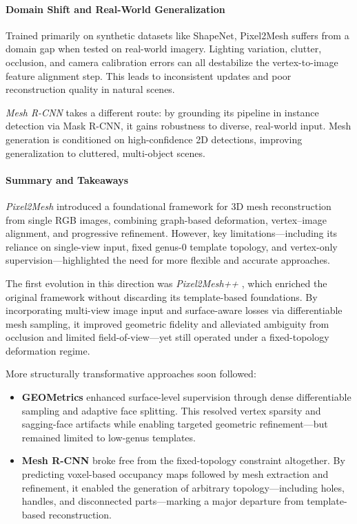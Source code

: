 \paragraph{Domain Shift and Real-World Generalization}

Trained primarily on synthetic datasets like ShapeNet, Pixel2Mesh suffers from a domain gap when tested on real-world imagery. Lighting variation, clutter, occlusion, and camera calibration errors can all destabilize the vertex-to-image feature alignment step. This leads to inconsistent updates and poor reconstruction quality in natural scenes.

\emph{Mesh R-CNN} \cite{gkioxari2020_meshrcnn} takes a different route: by grounding its pipeline in instance detection via Mask R-CNN, it gains robustness to diverse, real-world input. Mesh generation is conditioned on high-confidence 2D detections, improving generalization to cluttered, multi-object scenes.

\paragraph{Summary and Takeaways}

\emph{Pixel2Mesh} introduced a foundational framework for 3D mesh reconstruction from single RGB images, combining graph-based deformation, vertex–image alignment, and progressive refinement. However, key limitations—including its reliance on single-view input, fixed genus-0 template topology, and vertex-only supervision—highlighted the need for more flexible and accurate approaches.

The first evolution in this direction was \emph{Pixel2Mesh++} \cite{wen2019_pixel2meshplusplus}, which enriched the original framework without discarding its template-based foundations. By incorporating multi-view image input and surface-aware losses via differentiable mesh sampling, it improved geometric fidelity and alleviated ambiguity from occlusion and limited field-of-view—yet still operated under a fixed-topology deformation regime.

More structurally transformative approaches soon followed:
\begin{itemize}
    \item \textbf{GEOMetrics} \cite{smith2019_geometric} enhanced surface-level supervision through dense differentiable sampling and adaptive face splitting. This resolved vertex sparsity and sagging-face artifacts while enabling targeted geometric refinement—but remained limited to low-genus templates.
    \item \textbf{Mesh R-CNN} \cite{gkioxari2020_meshrcnn} broke free from the fixed-topology constraint altogether. By predicting voxel-based occupancy maps followed by mesh extraction and refinement, it enabled the generation of arbitrary topology—including holes, handles, and disconnected parts—marking a major departure from template-based reconstruction.
\end{itemize}

